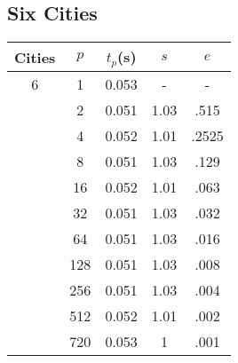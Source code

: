 \documentclass[12pt, letterpaper]{article}
\begin{document}
\subsection{Six Cities}
\begin{center}
  \begin{tabular}{|c | c c c c ||}
    \hline
    Cities & $p$ & $t_p$(s) & $s$ & $e$ \\
    \hline\hline
      6 & 1 &  0.053& - & - \\
       & 2 &  0.051& 1.03 & .515 \\
       & 4 &  0.052& 1.01 & .2525 \\
       & 8 &  0.051& 1.03 & .129 \\
       & 16 & 0.052 & 1.01 & .063 \\
       & 32 & 0.051 & 1.03 & .032 \\
       & 64 & 0.051 & 1.03 & .016 \\
       & 128 &0.051  & 1.03 & .008 \\
       & 256 &0.051  & 1.03 & .004 \\
       & 512 &0.052  & 1.01 & .002 \\
       & 720 &0.053  & 1 & .001 \\
      \hline\hline
      \hline
  \end{tabular}
\end{center}
\end{document}
